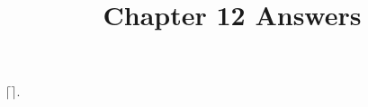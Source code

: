 \documentclass{article}
\title{Chapter 12 Answers}
\theoremstyle{definition}
\begin{document}
\date{}
\maketitle

$\bigl \lceil \bigr \rceil$.
\end{document}
